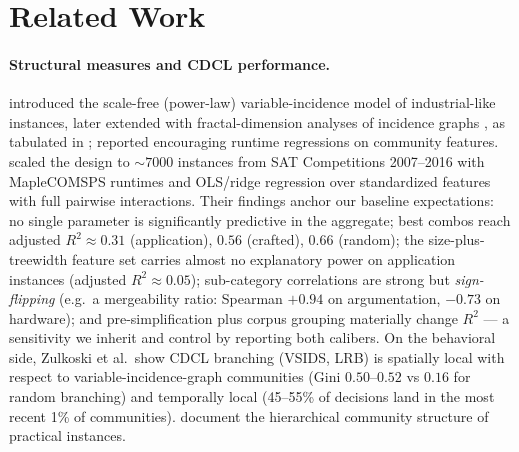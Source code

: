 \documentclass[pdflatex,sn-basic,Numbered]{sn-jnl}
\begin{document}
\section{Related Work}
\label{sec:related}

\paragraph{Structural measures and CDCL performance.}
\citet{ansotegui2009} introduced the scale-free (power-law) variable-incidence
model of industrial-like instances, later extended with
fractal-dimension analyses of incidence graphs \citep{ansotegui2014}, as
tabulated in \citep{zulkoski2018}; \citet{newsham2014} reported encouraging
runtime regressions on
community features. \citet{zulkoski2018} scaled the design to
${\sim}7000$ instances from SAT Competitions 2007--2016 with MapleCOMSPS
runtimes and OLS/ridge regression over standardized features with full
pairwise interactions. Their findings anchor our baseline expectations:
no single parameter is significantly predictive in the aggregate; best
combos reach adjusted $R^2 \approx 0.31$ (application), $0.56$ (crafted),
$0.66$ (random); the size-plus-treewidth feature set carries almost no
explanatory power on application instances (adjusted $R^2 \approx 0.05$);
sub-category correlations are strong but \emph{sign-flipping}
(e.g.\ a mergeability ratio: Spearman $+0.94$ on argumentation, $-0.73$ on
hardware); and pre-simplification plus corpus grouping materially change
$R^2$ --- a sensitivity we inherit and control by reporting both calibers.
On the behavioral side, Zulkoski et al.\ show CDCL branching (VSIDS, LRB) is
spatially local with respect to variable-incidence-graph communities (Gini
$0.50$--$0.52$ vs $0.16$ for random branching) and temporally local (45--55\%
of decisions land in the most recent 1\% of communities). \citet{li2022}
document the hierarchical community structure of practical
instances.
\end{document}
